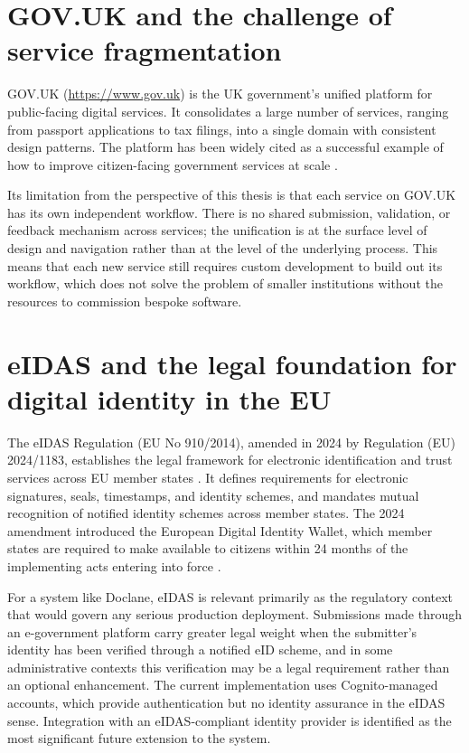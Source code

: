 
\section{GOV.UK and the challenge of service fragmentation}

\par GOV.UK (\url{https://www.gov.uk}) is the UK government's unified platform for public-facing digital services. It consolidates a large number of services, ranging from passport applications to tax filings, into a single domain with consistent design patterns. The platform has been widely cited as a successful example of how to improve citizen-facing government services at scale \cite{govuk2012}.

\par Its limitation from the perspective of this thesis is that each service on GOV.UK has its own independent workflow. There is no shared submission, validation, or feedback mechanism across services; the unification is at the surface level of design and navigation rather than at the level of the underlying process. This means that each new service still requires custom development to build out its workflow, which does not solve the problem of smaller institutions without the resources to commission bespoke software.


\section{eIDAS and the legal foundation for digital identity in the EU}

\par The eIDAS Regulation (EU No 910/2014), amended in 2024 by Regulation (EU) 2024/1183, establishes the legal framework for electronic identification and trust services across EU member states \cite{eidas2014, eidas2024}. It defines requirements for electronic signatures, seals, timestamps, and identity schemes, and mandates mutual recognition of notified identity schemes across member states. The 2024 amendment introduced the European Digital Identity Wallet, which member states are required to make available to citizens within 24 months of the implementing acts entering into force \cite{eidas2024}.

\par For a system like Doclane, eIDAS is relevant primarily as the regulatory context that would govern any serious production deployment. Submissions made through an e-government platform carry greater legal weight when the submitter's identity has been verified through a notified eID scheme, and in some administrative contexts this verification may be a legal requirement rather than an optional enhancement. The current implementation uses Cognito-managed accounts, which provide authentication but no identity assurance in the eIDAS sense. Integration with an eIDAS-compliant identity provider is identified as the most significant future extension to the system.

